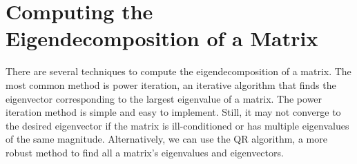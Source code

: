 \documentclass{article}[11pt]
\begin{document}


\section{Computing the Eigendecomposition of a Matrix}
There are several techniques to compute the eigendecomposition of a matrix. 
The most common method is power iteration, an iterative algorithm that finds the eigenvector corresponding to the largest eigenvalue of a matrix.
The power iteration method is simple and easy to implement. Still, it may not converge to the desired eigenvector if the matrix is ill-conditioned or has multiple eigenvalues of the same magnitude.
Alternatively, we can use the QR algorithm, a more robust method to find all a matrix's eigenvalues and eigenvectors.
\end{document}
